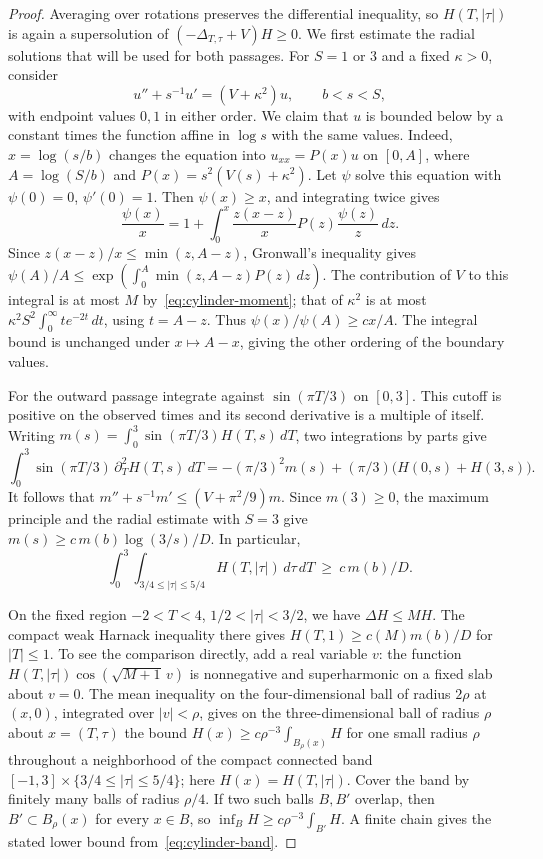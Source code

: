 \begin{proof}
Averaging over rotations preserves the differential inequality, so
$H(T,|\tau|)$ is again a supersolution of $(-\Delta_{T,\tau}+V)H\ge0$.
We first estimate the radial solutions that will be used for both
passages. For $S=1$ or $3$ and a fixed $\kappa>0$, consider
\[
 u''+s^{-1}u'=(V+\kappa^2)u,\qquad b<s<S,
\]
with endpoint values $0,1$ in either order. We claim that $u$ is bounded
below by a constant times the function affine in $\log s$ with the same
values. Indeed, $x=\log(s/b)$ changes the equation into
$u_{xx}=P(x)u$ on $[0,A]$, where $A=\log(S/b)$ and
$P(x)=s^2(V(s)+\kappa^2)$. Let $\psi$ solve this equation with
$\psi(0)=0$, $\psi'(0)=1$. Then $\psi(x)\ge x$, and integrating twice gives
\[
 \frac{\psi(x)}x
 =1+\int_0^x\frac{z(x-z)}x P(z)\frac{\psi(z)}z\,dz .
\]
Since $z(x-z)/x\le\min(z,A-z)$, Gronwall's inequality gives
$\psi(A)/A\le\exp(\int_0^A\min(z,A-z)P(z)\,dz)$. The contribution
of $V$ to this integral is at most $M$ by~\eqref{eq:cylinder-moment};
that of $\kappa^2$ is at most
$\kappa^2 S^2\int_0^\infty t e^{-2t}\,dt$, using $t=A-z$.
Thus $\psi(x)/\psi(A)\ge c x/A$. The integral bound is unchanged under
$x\mapsto A-x$, giving the other ordering of the boundary values.

For the outward passage integrate against $\sin(\pi T/3)$ on $[0,3]$.
This cutoff is positive on the observed times and its second derivative
is a multiple of itself. Writing $m(s)=\int_0^3\sin(\pi T/3)H(T,s)\,dT$,
two integrations by parts give
\[
 \int_0^3\sin(\pi T/3)\,\partial_T^2 H(T,s)\,dT
 =-(\pi/3)^2m(s)+(\pi/3)\bigl(H(0,s)+H(3,s)\bigr).
\]
It follows that $m''+s^{-1}m'\le(V+\pi^2/9)m$. Since $m(3)\ge0$,
the maximum principle and the radial estimate with $S=3$ give
$m(s)\ge c\,m(b)\log(3/s)/D$. In particular,
\begin{equation}\label{eq:cylinder-band}
 \int_0^3\int_{3/4\le|\tau|\le5/4}H(T,|\tau|)\,d\tau\,dT
 \ \ge\ c\,m(b)/D .
\end{equation}

On the fixed region $-2<T<4$, $1/2<|\tau|<3/2$, we have
$\Delta H\le MH$. The compact weak Harnack inequality there gives
$H(T,1)\ge c(M)m(b)/D$ for $|T|\le1$. To see the comparison directly,
add a real variable $v$: the function
$H(T,|\tau|)\cos(\sqrt{M+1}\,v)$ is nonnegative and superharmonic on a
fixed slab about $v=0$. The mean inequality on the four-dimensional ball of
radius $2\rho$ at $(x,0)$, integrated over $|v|<\rho$, gives on the
three-dimensional ball of radius $\rho$ about $x=(T,\tau)$ the bound $H(x)\ge c \rho^{-3}\int_{B_\rho(x)}H$ for one small
radius $\rho$ throughout a neighborhood of the compact connected band
$[-1,3]\times\{3/4\le|\tau|\le5/4\}$; here $H(x)=H(T,|\tau|)$.
Cover the band by finitely many balls of radius $\rho/4$. If two such
balls $B,B'$ overlap, then $B'\subset B_\rho(x)$ for every $x\in B$,
so $\inf_B H\ge c \rho^{-3}\int_{B'} H$. A finite chain gives the stated
lower bound from~\eqref{eq:cylinder-band}.


\end{proof}
